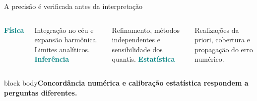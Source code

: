 \documentclass[aspectratio=169,11pt]{beamer}
\newcommand{\take}[1]{\par\vspace{2mm}\begin{beamercolorbox}[wd=\linewidth,sep=2.5mm]{block body}\small\textbf{#1}\end{beamercolorbox}}
\newcommand{\bigword}[2]{\textcolor{Teal}{\fontsize{30}{34}\selectfont\bfseries #1}\par\vspace{1mm}{\small #2}}
\begin{document}
\begin{frame}{A precisão é verificada antes da interpretação}
\begin{columns}[T]
\bigword{{\fontsize{20}{24}\selectfont Física}}{Resposta angular}\par\vspace{3mm}Integração no céu e expansão harmônica. Limites analíticos.
\bigword{{\fontsize{20}{24}\selectfont Inferência}}{Integração posterior}\par\vspace{3mm}Refinamento, métodos independentes e sensibilidade dos quantis.
\bigword{{\fontsize{20}{24}\selectfont Estatística}}{Calibração}\par\vspace{3mm}Realizações da priori, cobertura e propagação do erro numérico.
\end{columns}\vspace{4mm}\take{Concordância numérica e calibração estatística respondem a perguntas diferentes.}
\end{frame}
\end{document}
